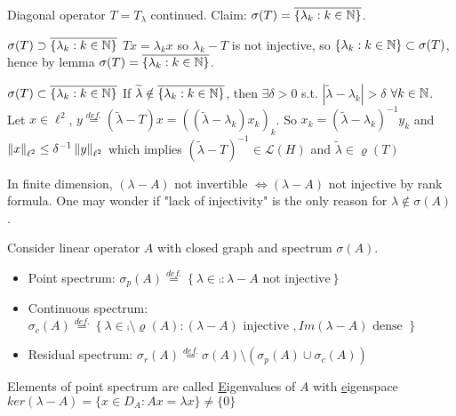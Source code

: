\begin{example}\nl
	Diagonal operator $T=T_\lambda$ continued. Claim: $\sigma(T)=\overline{\{\lambda_k:k\in\mathbb{N}\}}$.
	\begin{pf}{$\sigma(T)\supset\overline{\{\lambda_k:k\in\mathbb{N}\}}$}{}
		$Tx=\lambda_k x$ so $\lambda_k-T$ is not injective, so $\{\lambda_k:k\in\mathbb{N}\}\subset\sigma(T)$, hence by lemma $\sigma(T)=\overline{\{\lambda_k:k\in\mathbb{N}\}}$.
	\end{pf}

	\begin{pf}{$\sigma(T)\subset\overline{\{\lambda_k:k\in\mathbb{N}\}}$}{}
		If $\widetilde{\lambda}\notin\overline{\{\lambda_k:k\in\mathbb{N}\}}$, then $\exists\delta>0$ s.t. $|\widetilde{\lambda}-\lambda_k|>\delta$ $\forall k\in\mathbb{N}$. Let $x\in\ell^2$, $y\stackrel{def.}{=}(\widetilde{\lambda}-T)x=((\widetilde{\lambda}-\lambda_k)x_k)_k$. So $x_k=(\widetilde{\lambda}-\lambda_k)^{-1}y_k$ and $\left\|{x}\right\|_{\ell^2}\leq\delta^{-1}\left\|{y}\right\|_{\ell^2}$ which implies $(\widetilde{\lambda}-T)^{-1}\in\mathcal{L}(H)$ and $\widetilde{\lambda}\in\varrho(T)$
	\end{pf}
\end{example}

\begin{remark}\nl
	In finite dimension, $(\lambda-A)$ not invertible $\iff(\lambda-A)$ not injective by rank formula. One may wonder if "lack of injectivity" is the only reason for $\lambda\notin \sigma(A)$.
\end{remark}

\begin{definition}\nl
	Consider linear operator $A$ with closed graph and spectrum $\sigma(A)$.
	\begin{itemize}
		\item Point spectrum: $\sigma_p(A)\stackrel{def.}{=}
			      \left\{
			      \lambda\in \comp :\lambda-A \text{ not  injective}
			      \right\}$
		\item Continuous spectrum: $\sigma_c(A)\stackrel{def.}{=}
			      \left\{
			      \lambda\in\comp\setminus\varrho(A):(\lambda-A) \text{ injective }, Im(\lambda-A) \text{ dense }
			      \right\}$
		\item Residual spectrum:  $\sigma_r(A)\stackrel{def.}{=}\sigma(A)\setminus(
			      \sigma_p(A)\cup\sigma_c(A))$
	\end{itemize}
	Elements of point spectrum are called {\underline Eigenvalues of $A$} with {\underline eigenspace} $ker(\lambda-A)=\{x\in D_A:Ax=\lambda x\}\neq\{0\}$

\end{definition}

